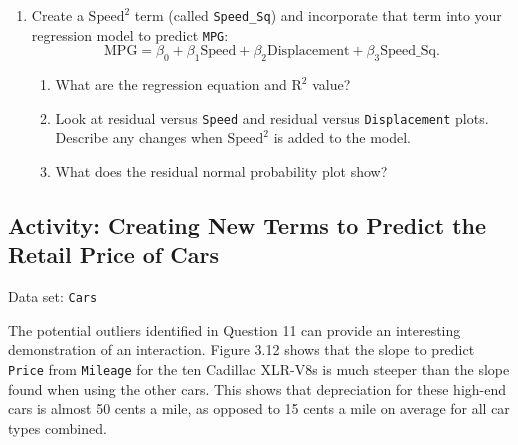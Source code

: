 \documentclass[
]{book}
\begin{document}
\begin{enumerate}
  \item Create a $\mathrm{Speed}^2$ term (called \texttt{Speed\_Sq}) and incorporate that term into your regression model to predict \texttt{MPG}:  
  \[
  \mathrm{MPG} = \beta_0 + \beta_1 \mathrm{Speed} + \beta_2 \mathrm{Displacement} + \beta_3 \mathrm{Speed\_Sq}.
  \]
  \begin{enumerate}
    \item What are the regression equation and $\mathrm{R}^2$ value?
    \item Look at residual versus \texttt{Speed} and residual versus \texttt{Displacement} plots. Describe any changes when $\mathrm{Speed}^2$ is added to the model.
    \item What does the residual normal probability plot show?
  \end{enumerate}

\end{enumerate}

\hypertarget{activity-creating-new-terms-to-predict-the-retail-price-of-cars}{%
\subsection*{Activity: Creating New Terms to Predict the Retail Price of Cars}\label{activity-creating-new-terms-to-predict-the-retail-price-of-cars}}

Data set: \texttt{Cars}

The potential outliers identified in Question 11 can provide an interesting demonstration of an interaction. Figure 3.12 shows that the slope to predict \texttt{Price} from \texttt{Mileage} for the ten Cadillac XLR-V8s is much steeper than the slope found when using the other cars. This shows that depreciation for these high-end cars is almost 50 cents a mile, as opposed to 15 cents a mile on average for all car types combined.
\end{document}
